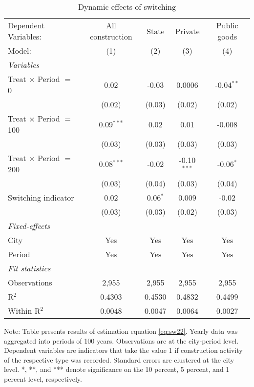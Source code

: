 \begin{table}[htbp]
   \caption{\label{tab:SW22_replication_100y} Dynamic effects of switching}
   \centering
   \begin{tabular}{lcccc}
      \tabularnewline \midrule \midrule
      Dependent Variables:           & All construction & State      & Private       & Public goods\\  
      Model:                         & (1)              & (2)        & (3)           & (4)\\  
      \midrule
      \emph{Variables}\\
      Treat $\times$ Period $=$ 0    & 0.02             & -0.03      & 0.0006        & -0.04$^{**}$\\   
                                     & (0.02)           & (0.03)     & (0.02)        & (0.02)\\   
      Treat $\times$ Period $=$ 100  & 0.09$^{***}$     & 0.02       & 0.01          & -0.008\\   
                                     & (0.03)           & (0.03)     & (0.03)        & (0.03)\\   
      Treat $\times$ Period $=$ 200  & 0.08$^{***}$     & -0.02      & -0.10$^{***}$ & -0.06$^{*}$\\   
                                     & (0.03)           & (0.04)     & (0.03)        & (0.04)\\   
      Switching indicator            & 0.02             & 0.06$^{*}$ & 0.009         & -0.02\\   
                                     & (0.03)           & (0.03)     & (0.02)        & (0.03)\\   
      \midrule
      \emph{Fixed-effects}\\
      City                           & Yes              & Yes        & Yes           & Yes\\  
      Period                         & Yes              & Yes        & Yes           & Yes\\  
      \midrule
      \emph{Fit statistics}\\
      Observations                   & 2,955            & 2,955      & 2,955         & 2,955\\  
      R$^2$                          & 0.4303           & 0.4530     & 0.4832        & 0.4499\\  
      Within R$^2$                   & 0.0048           & 0.0047     & 0.0064        & 0.0027\\  
      \midrule \midrule
      
      
   \end{tabular}
   
   \par \raggedright 
   Note: Table presents results of estimation equation \eqref{eq:sw22}. Yearly data was aggregated into periods of 100 years. Observations are at the city-period  level. Dependent variables are indicators that take the value 1 if  construction activity of the respective type was recorded. Standard errors are  clustered at the city level. *, **, and *** denote significance on the 10 percent, 5 percent, and 1 percent  level, respectively.
\end{table}
